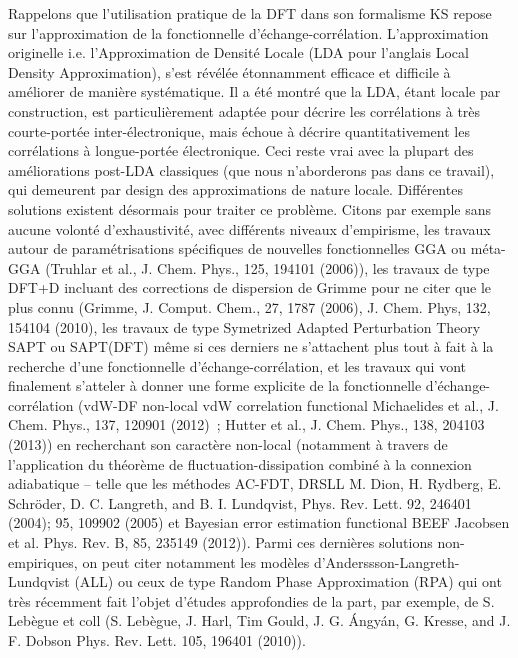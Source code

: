 Rappelons que l’utilisation pratique de la DFT dans son formalisme KS repose sur l’approximation de la fonctionnelle d’échange-corrélation. L’approximation originelle i.e. l’Approximation de Densité Locale (LDA pour l’anglais Local Density Approximation), s’est révélée étonnamment efficace et difficile à améliorer de manière systématique. Il a été montré que la LDA, étant locale par construction, est particulièrement adaptée pour décrire les corrélations à très courte-portée inter-électronique, mais échoue à décrire quantitativement les corrélations à longue-portée électronique. Ceci reste vrai avec la plupart des améliorations post-LDA classiques (que nous n’aborderons pas dans ce travail), qui demeurent par design des approximations de nature locale. Différentes solutions existent désormais pour traiter ce problème. Citons par exemple sans aucune volonté d’exhaustivité, avec différents niveaux d’empirisme, les travaux autour de paramétrisations spécifiques de nouvelles fonctionnelles GGA ou méta-GGA (Truhlar et al., J. Chem. Phys., 125, 194101 (2006)), les travaux de type DFT+D incluant des corrections de dispersion de Grimme pour ne citer que le plus connu (Grimme, J. Comput. Chem., 27, 1787 (2006), J. Chem. Phys, 132, 154104 (2010), les travaux de type Symetrized Adapted Perturbation Theory SAPT ou SAPT(DFT) même si ces derniers ne s’attachent plus tout à fait à la recherche d’une fonctionnelle d’échange-corrélation, et les travaux qui vont finalement s’atteler à donner une forme explicite de la fonctionnelle d’échange-corrélation (vdW-DF non-local vdW correlation functional Michaelides et al., J. Chem. Phys., 137, 120901 (2012) ; Hutter et al., J. Chem. Phys., 138, 204103 (2013)) en recherchant son caractère non-local (notamment à travers de l’application du théorème de fluctuation-dissipation combiné à la connexion adiabatique – telle que les méthodes AC-FDT, DRSLL M. Dion, H. Rydberg, E. Schröder, D. C. Langreth, and B. I. Lundqvist, Phys. Rev. Lett. 92, 246401 (2004); 95, 109902 (2005) et Bayesian error estimation functional BEEF Jacobsen et al. Phys. Rev. B, 85, 235149 (2012)). Parmi ces dernières solutions non-empiriques, on peut citer notamment les modèles d’Anderssson-Langreth-Lundqvist (ALL) ou ceux de type Random Phase Approximation (RPA) qui ont très récemment fait l’objet d’études approfondies de la part, par exemple, de S. Lebègue et coll (S. Lebègue, J. Harl, Tim Gould, J. G. Ángyán, G. Kresse, and J. F. Dobson Phys. Rev. Lett. 105, 196401 (2010)).\\

